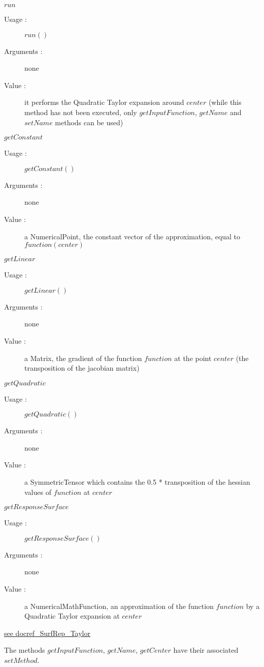 \begin{description}
\begin{description}
  \item $run$
    \begin{description}
    \item[Usage :] $run()$
    \item[Arguments :] none
    \item[Value :] it performs the Quadratic Taylor expansion around $center$
      (while this method has not been executed, only
      $getInputFunction$, $getName$ and $setName$ methods can be used)
    \end{description}
    \bigskip

  \item $getConstant$
    \begin{description}
    \item[Usage :] $getConstant()$
    \item[Arguments :] none
    \item[Value :] a NumericalPoint, the constant vector of the approximation, equal to $function(center)$
    \end{description}
    \bigskip

  \item $getLinear$
    \begin{description}
    \item[Usage :] $getLinear()$
    \item[Arguments :] none
    \item[Value :] a Matrix, the gradient of the function $function$ at the point $center$ (the transposition of the jacobian matrix)
    \end{description}
    \bigskip

  \item $getQuadratic$
    \begin{description}
    \item[Usage :] $getQuadratic()$
    \item[Arguments :] none
    \item[Value :] a SymmetricTensor which contains the 0.5 *  transposition of the hessian values of $function$ at $center$
    \end{description}
    \bigskip

  \item $getResponseSurface$
    \begin{description}
    \item[Usage :] $getResponseSurface()$
    \item[Arguments :] none
    \item[Value :] a NumericalMathFunction, an approximation of the function $function$ by a Quadratic Taylor expansion at  $center$
    \end{description}
  \end{description}

\item[Links :] \rule{0pt}{1em}
  \href{./Version/docref_SurfRep_Taylor_en.pdf}{see docref\_SurfRep\_Taylor}

  The methods $getInputFunction$, $getName$, $getCenter$ have their associated $setMethod$.

\end{description}



